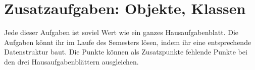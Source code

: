 

\usepackage[T1]{fontenc}




\section*{Zusatzaufgaben: Objekte, Klassen}

Jede dieser Aufgaben ist soviel Wert wie ein ganzes Hausaufgabenblatt.
Die Aufgaben könnt ihr im Laufe des Semesters lösen, indem ihr eine
entsprechende Datenstruktur baut. Die Punkte können als Zusatzpunkte
fehlende Punkte bei den drei Hausaufgabenblättern ausgleichen.

